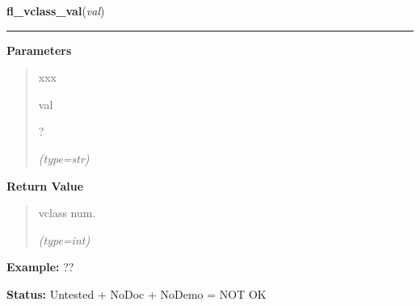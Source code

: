 \hspace{.8\funcindent}\begin{boxedminipage}{\funcwidth}

    \raggedright \textbf{fl\_vclass\_val}(\textit{val})

    \vspace{-1.5ex}

    \rule{\textwidth}{0.5\fboxrule}
\setlength{\parskip}{2ex}
\setlength{\parskip}{1ex}
      \textbf{Parameters}
      \vspace{-1ex}

      \begin{quote}
        \begin{Ventry}{xxx}

          \item[val]

          ?

            {\it (type=str)}

        \end{Ventry}

      \end{quote}

      \textbf{Return Value}
    \vspace{-1ex}

      \begin{quote}
      vclass num.

      {\it (type=int)}

      \end{quote}

\textbf{Example:} ??



\textbf{Status:} Untested + NoDoc + NoDemo = NOT OK



    \end{boxedminipage}

    \label{xformslib:flxbasic:fl_set_ul_property}

    \vspace{0.5ex}

